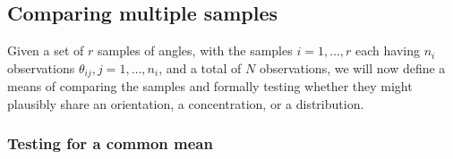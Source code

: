 \documentclass[../../ArchStats.tex]{subfiles}
\begin{document}



\subsection{Comparing multiple samples}
\label{sec:similarity-tests}

Given a set of $r$  samples of angles, with the samples $i = 1, \dots, r$ each having $n_i$ observations $\theta_{ij}, j = 1, \dots, n_i$, and a total of $N$ observations, we will now define a means of comparing the samples and formally testing whether they might plausibly share an orientation, a concentration, or a distribution. 

\subsubsection{Testing for a common mean}
\label{sec:common-mean-test}
\end{document}
